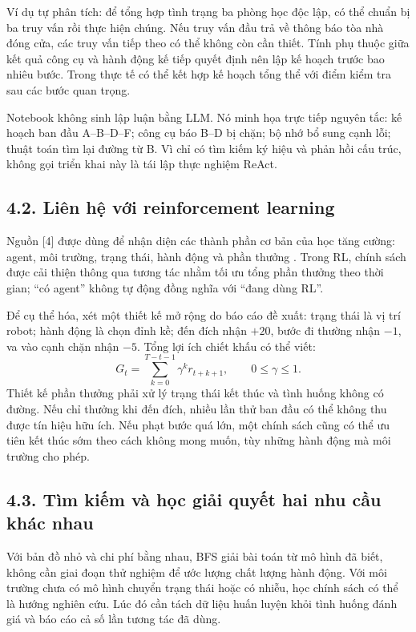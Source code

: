 \documentclass[11pt,a4paper]{article}
\begin{document}
Ví dụ tự phân tích: để tổng hợp tình trạng ba phòng học độc lập, có thể chuẩn bị ba truy
vấn rồi thực hiện chúng. Nếu truy vấn đầu trả về thông báo tòa nhà đóng cửa, các truy
vấn tiếp theo có thể không còn cần thiết. Tính phụ thuộc giữa kết quả công cụ và hành
động kế tiếp quyết định nên lập kế hoạch trước bao nhiêu bước. Trong thực tế có thể
kết hợp kế hoạch tổng thể với điểm kiểm tra sau các bước quan trọng.

Notebook không sinh lập luận bằng LLM. Nó minh họa trực tiếp nguyên tắc: kế hoạch
ban đầu A--B--D--F; công cụ báo B--D bị chặn; bộ nhớ bổ sung cạnh lỗi; thuật toán tìm
lại đường từ B. Vì chỉ có tìm kiếm ký hiệu và phản hồi cấu trúc, không gọi triển khai
này là tái lập thực nghiệm ReAct.

\subsection{4.2. Liên hệ với reinforcement learning}
Nguồn [4] được dùng để nhận diện các thành phần cơ bản của học tăng cường: agent,
môi trường, trạng thái, hành động và phần thưởng \cite{gfg}. Trong RL, chính sách được
cải thiện thông qua tương tác nhằm tối ưu tổng phần thưởng theo thời gian; ``có agent''
không tự động đồng nghĩa với ``đang dùng RL''.

Để cụ thể hóa, xét một thiết kế mở rộng do báo cáo đề xuất: trạng thái là vị trí robot;
hành động là chọn đỉnh kề; đến đích nhận $+20$, bước đi thường nhận $-1$, va vào cạnh
chặn nhận $-5$. Tổng lợi ích chiết khấu có thể viết:
\[
G_t=\sum_{k=0}^{T-t-1}\gamma^k r_{t+k+1},\qquad 0\leq\gamma\leq1.
\]
Thiết kế phần thưởng phải xử lý trạng thái kết thúc và tình huống không có đường. Nếu
chỉ thưởng khi đến đích, nhiều lần thử ban đầu có thể không thu được tín hiệu hữu ích.
Nếu phạt bước quá lớn, một chính sách cũng có thể ưu tiên kết thúc sớm theo cách không
mong muốn, tùy những hành động mà môi trường cho phép.

\subsection{4.3. Tìm kiếm và học giải quyết hai nhu cầu khác nhau}
Với bản đồ nhỏ và chi phí bằng nhau, BFS giải bài toán từ mô hình đã biết, không cần
giai đoạn thử nghiệm để ước lượng chất lượng hành động. Với môi trường chưa có mô hình
chuyển trạng thái hoặc có nhiễu, học chính sách có thể là hướng nghiên cứu. Lúc đó cần
tách dữ liệu huấn luyện khỏi tình huống đánh giá và báo cáo cả số lần tương tác đã dùng.
\end{document}
